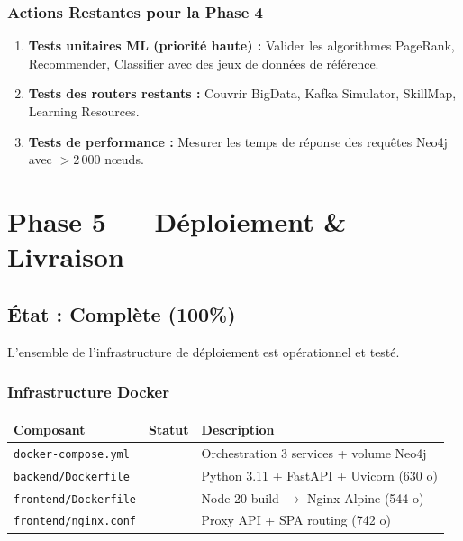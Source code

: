 \documentclass[12pt,a4paper]{article}
\newcommand{\cmark}{\textcolor{vert}{\ding{51}}}
\begin{document}
\subsubsection{Actions Restantes pour la Phase 4}

\begin{enumerate}[leftmargin=*]
    \item \textbf{Tests unitaires ML (priorité haute) :} Valider les algorithmes PageRank, Recommender, Classifier avec des jeux de données de référence.
    \item \textbf{Tests des routers restants :} Couvrir BigData, Kafka Simulator, SkillMap, Learning Resources.
    \item \textbf{Tests de performance :} Mesurer les temps de réponse des requêtes Neo4j avec $>$2\,000 nœuds.
\end{enumerate}

\section{Phase 5 — Déploiement \& Livraison}

\subsection{État : \textcolor{vert}{Complète (100\%)}}

L'ensemble de l'infrastructure de déploiement est opérationnel et testé.

\subsubsection{Infrastructure Docker}

\begin{center}
\renewcommand{\arraystretch}{1.3}
\begin{tabular}{|l|c|l|}
\hline
\rowcolor{bleu!15}
\textbf{Composant} & \textbf{Statut} & \textbf{Description} \\
\hline
\texttt{docker-compose.yml} & \cmark & Orchestration 3 services + volume Neo4j \\
\hline
\texttt{backend/Dockerfile} & \cmark & Python 3.11 + FastAPI + Uvicorn (630 o) \\
\hline
\texttt{frontend/Dockerfile} & \cmark & Node 20 build $\to$ Nginx Alpine (544 o) \\
\hline
\texttt{frontend/nginx.conf} & \cmark & Proxy API + SPA routing (742 o) \\
\hline
\end{tabular}
\end{center}
\end{document}
